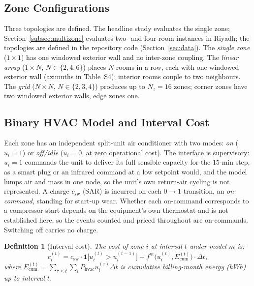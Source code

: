 \documentclass[3p,twocolumn,number]{elsarticle}
\newtheorem{definition}{Definition} \newtheorem{proposition}{Proposition} \newtheorem{remark}{Remark} \newtheorem{observation}{Observation} \newtheorem{corollary}{Corollary}
\newcommand{\csw}{c_{\mathrm{sw}}}
\newcommand{\Phvac}{P_{\mathrm{hvac}}}
\begin{document}
\subsection{Zone Configurations}
\label{subsec:configs}
 
Three topologies are defined. The headline study evaluates the single zone; Section~\ref{subsec:multizone} evaluates two- and four-room instances in Riyadh; the topologies are defined in the repository code (Section~\ref{sec:data}). The \emph{single zone} ($1\times1$) has one windowed exterior wall and no inter-zone coupling. The \emph{linear array} ($1\times N$, $N\in\{2,4,6\}$) places $N$ rooms in a row, each with one windowed exterior wall (azimuths in Table~S4); interior rooms couple to two neighbours. The \emph{grid} ($N\times N$, $N\in\{2,3,4\}$) produces up to $N_z=16$ zones; corner zones have two windowed exterior walls, edge zones one.
 

 
\subsection{Binary HVAC Model and Interval Cost}
\label{subsec:hvac_model}
 
Each zone has an independent split-unit air conditioner with two modes: \emph{on} ($u_i=1$) or \emph{off/idle} ($u_i=0$, at zero operational cost). The interface is supervisory: $u_i=1$ commands the unit to deliver its full sensible capacity for the $15$-min step, as a smart plug or an infrared command at a low setpoint would, and the model lumps air and mass in one node, so the unit's own return-air cycling is not represented. A charge $\csw$ (SAR) is incurred on each $0\to1$ transition, an \emph{on-command}, standing for start-up wear. Whether each on-command corresponds to a compressor start depends on the equipment's own thermostat and is not established here, so the events counted and priced throughout are on-commands. Switching off carries no charge.
 
\begin{definition}[Interval cost]
\label{def:interval_cost}
The cost of zone $i$ at interval $t$ under model $m$ is:
\begin{equation}
  c_i^{(t)} = \csw\cdot\mathbf{1}\!\bigl[u_i^{(t)}>u_i^{(t-1)}\bigr]
             + f^m\!\bigl(u_i^{(t)},E_{\mathrm{cum}}^{(t)}\bigr)\cdot\Delta t,
  \label{eq:interval_cost}
\end{equation}
where $E_{\mathrm{cum}}^{(t)}=\sum_{\tau\le t}\!\sum_i\Phvac u_i^{(\tau)}\Delta t$ is cumulative billing-month energy (kWh) up to interval $t$.
\end{definition}
 
\end{document}
